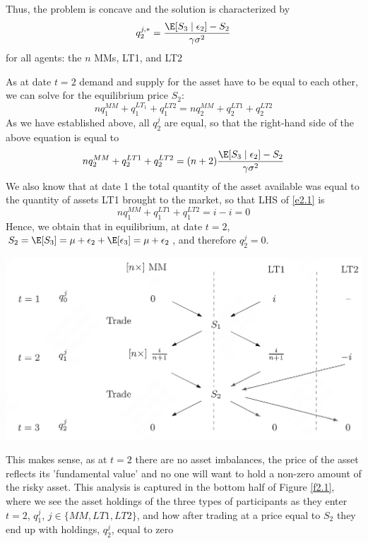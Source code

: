 \documentclass[11pt]{article}
\begin{document}
Thus, the problem is concave and the solution is characterized by
\begin{equation*}
q_2^{j,*}=\frac{\E[S_3\mid\epsilon_2]-S_2}{\gamma\sigma^2}
\end{equation*}
for all agents: the \(n\) MMs, LT1, and LT2

As at date \(t=2\) demand and supply for the asset have to be equal to each other, we can solve for
the equilibrium price \(S_2\):
\begin{equation}
\label{e2.1}
nq_1^{MM}+q_1^{LT_1}+q_1^{LT2}=nq_2^{MM}+q_2^{LT1}+q_2^{LT2}
\end{equation}
As we have established above, all \(q_2^j\) are equal, so that the right-hand side of the above
equation is equal to
\begin{equation}
\label{e2.2}
nq_2^{MM}+q_2^{LT1}+q_2^{LT2}=(n+2)\frac{\E[S_3\mid\epsilon_2]-S_2}{\gamma\sigma^2}
\end{equation}
We also know that at date 1 the total quantity of the asset available was equal to the quantity of
assets LT1 brought to the market, so that LHS of \eqref{e2.1} is
\begin{equation*}
nq_1^{MM}+q_1^{LT1}+q_1^{LT2}=i-i=0
\end{equation*}
Hence, we obtain that in equilibrium, at date \(t=2\),
\(S_2=\E[S_3]=\mu+\epsilon_2+\E[\epsilon_3]=\mu+\epsilon_2\), and therefore \(q_2^j=0\).

\begin{center}
\includegraphics[width=.8\textwidth]{../images/Misc/19.png}
\end{center}


This makes sense, as at \(t=2\) there are no asset imbalances, the price of the asset reflects its
'fundamental value' and no one will want to hold a non-zero amount of the risky asset. This analysis
is captured in the bottom half of Figure \ref{f2.1}, where we see the asset holdings of the three types
of participants as they enter \(t=2\), \(q_1^j\), \(j\in\{MM,LT1,LT2\}\), and how after trading at a
price equal to \(S_2\) they end up with holdings, \(q_2^j\), equal to zero
\end{document}
